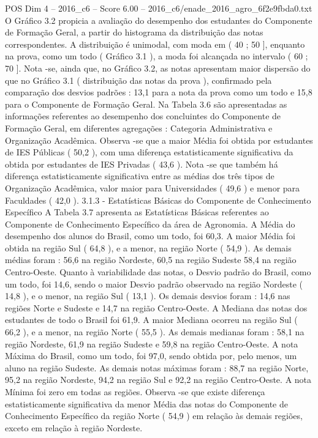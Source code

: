 \begin{textsample}{POS Dim 4 – 2016\_c6 – Score 6.00 – 2016\_c6/enade\_2016\_agro\_6f2e9fbda0.txt}
O Gráfico 3.2 propicia a avaliação do desempenho dos estudantes do Componente de Formação Geral, a partir do histograma da distribuição das notas correspondentes.
A distribuição é unimodal, com moda em ( 40 ; 50 ], enquanto na prova, como um todo ( Gráfico 3.1 ), a moda foi alcançada no intervalo ( 60 ; 70 ].
Nota -se, ainda que, no Gráfico 3.2, as notas apresentam maior dispersão do que no Gráfico 3.1 ( distribuição das notas da prova ), confirmado pela comparação dos desvios padrões : 13,1 para a nota da prova como um todo e 15,8 para o Componente de Formação Geral.
Na Tabela 3.6 são apresentadas as informações referentes ao desempenho dos concluintes do Componente de Formação Geral, em diferentes agregações : Categoria Administrativa e Organização Acadêmica.
Observa -se que a maior Média foi obtida por estudantes de IES Públicas ( 50,2 ), com uma diferença estatisticamente significativa da obtida por estudantes de IES Privadas ( 43,6 ).
Nota -se que também há diferença estatisticamente significativa entre as médias dos três tipos de Organização Acadêmica, valor maior para Universidades ( 49,6 ) e menor para Faculdades ( 42,0 ). 3.1.3 - Estatísticas Básicas do Componente de Conhecimento Específico A Tabela 3.7 apresenta as Estatísticas Básicas referentes ao Componente de Conhecimento Específico da área de Agronomia.
A Média do desempenho dos alunos do Brasil, como um todo, foi 60,3.
A maior Média foi obtida na região Sul ( 64,8 ), e a menor, na região Norte ( 54,9 ).
As demais médias foram : 56,6 na região Nordeste, 60,5 na região Sudeste 58,4 na região Centro-Oeste.
Quanto à variabilidade das notas, o Desvio padrão do Brasil, como um todo, foi 14,6, sendo o maior Desvio padrão observado na região Nordeste ( 14,8 ), e o menor, na região Sul ( 13,1 ).
Os demais desvios foram : 14,6 nas regiões Norte e Sudeste e 14,7 na região Centro-Oeste.
A Mediana das notas dos estudantes de todo o Brasil foi 61,9.
A maior Mediana ocorreu na região Sul ( 66,2 ), e a menor, na região Norte ( 55,5 ).
As demais medianas foram : 58,1 na região Nordeste, 61,9 na região Sudeste e 59,8 na região Centro-Oeste.
A nota Máxima do Brasil, como um todo, foi 97,0, sendo obtida por, pelo menos, um aluno na região Sudeste.
As demais notas máximas foram : 88,7 na região Norte, 95,2 na região Nordeste, 94,2 na região Sul e 92,2 na região Centro-Oeste.
A nota Mínima foi zero em todas as regiões.
Observa -se que existe diferença estatisticamente significativa da menor Média das notas do Componente de Conhecimento Específico da região Norte ( 54,9 ) em relação às demais regiões, exceto em relação à região Nordeste.

\end{textsample}
